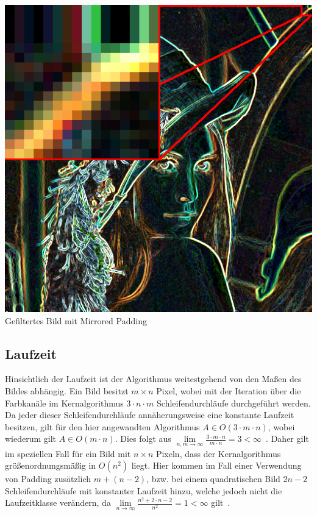\documentclass[course=asp]{aspdoc}
\begin{document}
\includegraphics[scale=0.25]{resources/lenaPBig}\quad Gefiltertes Bild mit Mirrored Padding

\subsection{Laufzeit}
Hinsichtlich der Laufzeit ist der Algorithmus weitestgehend von den Maßen des Bildes abhängig. Ein Bild besitzt $m\times n$ Pixel, wobei mit der Iteration über die Farbkanäle im Kernalgorithmus $3 \cdot n \cdot m$ Schleifendurchläufe durchgeführt werden. Da jeder dieser Schleifendurchläufe annäherungsweise eine konstante Laufzeit besitzen, gilt für den hier angewandten Algorithmus $A \in O(3\cdot m\cdot n)$, wobei wiederum gilt $A \in O(m \cdot n)$. Dies folgt aus $\lim\limits_{n,m \rightarrow \infty}\frac{3\cdot m \cdot n}{m\cdot n} = 3  < \infty$~\cite{landauwiki}. Daher gilt im speziellen Fall für ein Bild mit $n\times n$ Pixeln, dass der Kernalgorithmus größenordnungsmäßig in $O(n^{2})$ liegt. Hier kommen im Fall einer Verwendung von Padding zusätzlich $m + (n-2)$, bzw. bei einem quadratischen Bild $2n - 2$ Schleifendurchläufe mit konstanter Laufzeit hinzu, welche jedoch nicht  die Laufzeitklasse verändern, da $\lim\limits_{n \rightarrow \infty}\frac{n^2+2 \cdot n-2}{n^2} = 1 < \infty$ gilt~\cite{landauwiki}.
\newpage
\end{document}
